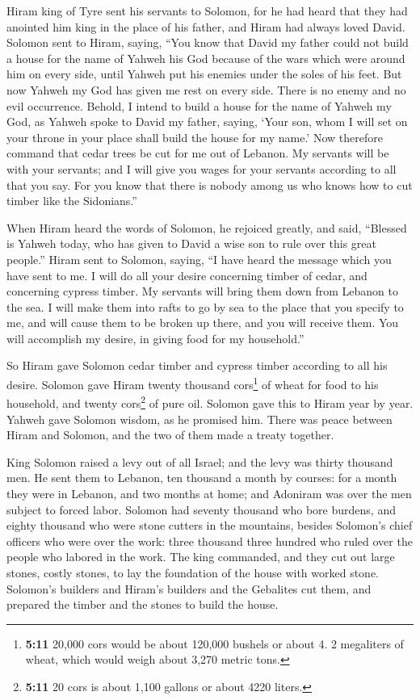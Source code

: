  Hiram king of Tyre sent his servants to Solomon, for he
had heard that they had anointed him king in the place of his father,
and Hiram had always loved David.  Solomon sent to Hiram,
saying,  ``You know that David my father could not build a
house for the name of Yahweh his God because of the wars which were
around him on every side, until Yahweh put his enemies under the soles
of his feet.  But now Yahweh my God has given me rest on
every side. There is no enemy and no evil occurrence. 
Behold, I intend to build a house for the name of Yahweh my God, as
Yahweh spoke to David my father, saying, `Your son, whom I will set on
your throne in your place shall build the house for my name.'
 Now therefore command that cedar trees be cut for me out
of Lebanon. My servants will be with your servants; and I will give you
wages for your servants according to all that you say. For you know that
there is nobody among us who knows how to cut timber like the
Sidonians.''

 When Hiram heard the words of Solomon, he rejoiced
greatly, and said, ``Blessed is Yahweh today, who has given to David a
wise son to rule over this great people.''  Hiram sent to
Solomon, saying, ``I have heard the message which you have sent to me. I
will do all your desire concerning timber of cedar, and concerning
cypress timber.  My servants will bring them down from
Lebanon to the sea. I will make them into rafts to go by sea to the
place that you specify to me, and will cause them to be broken up there,
and you will receive them. You will accomplish my desire, in giving food
for my household.''

 So Hiram gave Solomon cedar timber and cypress timber
according to all his desire.  Solomon gave Hiram twenty
thousand cors\footnote{\textbf{5:11} 20,000 cors would be about 120,000
  bushels or about 4. 2 megaliters of wheat, which would weigh about
  3,270 metric tons.} of wheat for food to his household, and twenty
cors\footnote{\textbf{5:11} 20 cors is about 1,100 gallons or about 4220
  liters.} of pure oil. Solomon gave this to Hiram year by year.
 Yahweh gave Solomon wisdom, as he promised him. There
was peace between Hiram and Solomon, and the two of them made a treaty
together.

 King Solomon raised a levy out of all Israel; and the
levy was thirty thousand men.  He sent them to Lebanon,
ten thousand a month by courses: for a month they were in Lebanon, and
two months at home; and Adoniram was over the men subject to forced
labor.  Solomon had seventy thousand who bore burdens,
and eighty thousand who were stone cutters in the mountains,
 besides Solomon's chief officers who were over the work:
three thousand three hundred who ruled over the people who labored in
the work.  The king commanded, and they cut out large
stones, costly stones, to lay the foundation of the house with worked
stone.  Solomon's builders and Hiram's builders and the
Gebalites cut them, and prepared the timber and the stones to build the
house.

